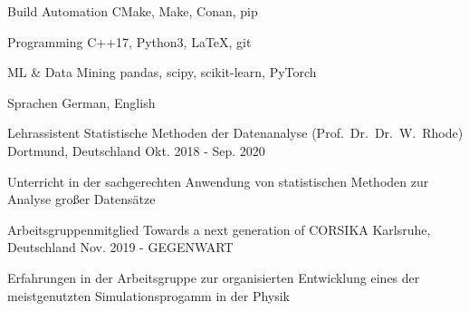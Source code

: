 \documentclass[11pt, a4paper]{Awesome-CV/awesome-cv}
\begin{document}
\begin{cvskills}
    \cvskill
    {Build Automation} %
    {CMake, Make, Conan, pip} %


    \cvskill
    {Programming} %
    {C++17, Python3, LaTeX, git} %

    \cvskill
    {ML \& Data Mining} %
    {pandas, scipy, scikit-learn, PyTorch} %

    \cvskill
    {Sprachen} %
    {German, English} %
\end{cvskills}

\begin{cventries}
    \cventry
    {Lehrassistent} %
    {Statistische Methoden der Datenanalyse (Prof.~Dr.~Dr.~W.~Rhode)} %
    {Dortmund, Deutschland} %
    {Okt. 2018 - Sep. 2020} %
    {
        \begin{cvitems} %
        \item {Unterricht in der sachgerechten Anwendung von statistischen Methoden zur Analyse großer Datensätze}
        \end{cvitems}
    }

    \cventry
    {Arbeitsgruppenmitglied} %
    {Towards a next generation of CORSIKA} %
    {Karlsruhe, Deutschland} %
    {Nov. 2019 - GEGENWART} %
    {
        \begin{cvitems} %
        \item {Erfahrungen in der Arbeitsgruppe zur organisierten
            Entwicklung eines der meistgenutzten Simulationsprogamm in der Physik}
        \end{cvitems}
    }
\end{cventries}
\end{document}

